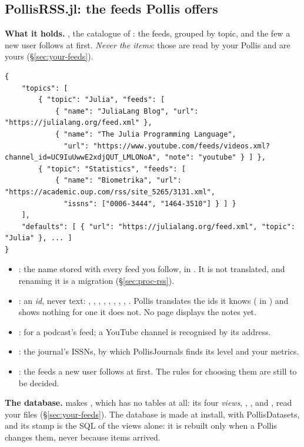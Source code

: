 \subsection{PollisRSS.jl: the feeds Pollis offers}
\textbf{What it holds.} , the catalogue of : the feeds,
grouped by topic, and the few a new user follows at first. \emph{Never the items}: those are read by your Pollis and
are yours (\S\ref{sec:your-feeds}).
\begin{lstlisting}
{
	"topics": [
		{ "topic": "Julia", "feeds": [
			{ "name": "JuliaLang Blog", "url": "https://julialang.org/feed.xml" },
			{ "name": "The Julia Programming Language",
			  "url": "https://www.youtube.com/feeds/videos.xml?channel_id=UC9IuUwwE2xdjQUT_LMLONoA", "note": "youtube" } ] },
		{ "topic": "Statistics", "feeds": [
			{ "name": "Biometrika", "url": "https://academic.oup.com/rss/site_5265/3131.xml",
			  "issns": ["0006-3444", "1464-3510"] } ] }
	],
	"defaults": [ { "url": "https://julialang.org/feed.xml", "topic": "Julia" }, ... ]
}
\end{lstlisting}
\begin{itemize}
  \item {}: the name stored with every feed you follow, in . It is not translated, and
    renaming it is a migration (\S\ref{sec:proc-rss}).
  \item {}: an \emph{id}, never text: , , , ,
    , , , , . Pollis translates the ids it
    knows ( in ) and shows nothing for one it does not. No page displays the
    notes yet.
  \item {}:  for a podcast's feed; a YouTube channel is recognised by its address.
  \item {}: the journal's ISSNs, by which PollisJournals finds its level and your metrics.
  \item {}: the feeds a new user follows at first. The rules for choosing them are still to be decided.
\end{itemize}

\textbf{The database.}  makes , which has no tables at all: its four
\emph{views}, , ,  and , read your files (\S\ref{sec:your-feeds}).
The database is made at install, with PollisDatasets, and its stamp is the SQL of the views alone: it is rebuilt only
when a Pollis changes them, never because items arrived.


